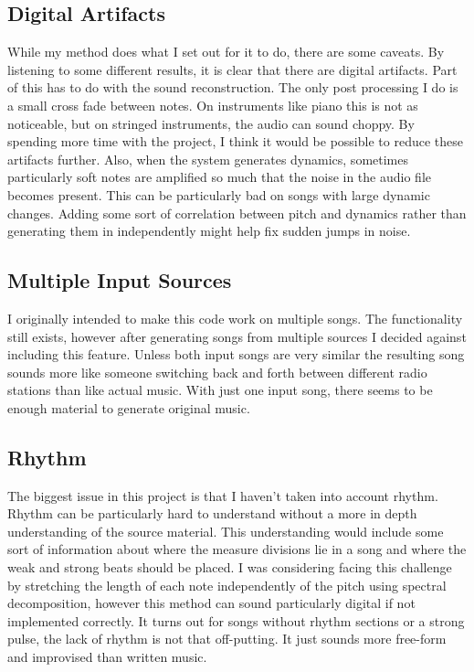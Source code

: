 \documentclass{amsart}
\theoremstyle{definition}
\begin{document}
\subsection{Digital Artifacts}

While my method does what I set out for it to do, there are some caveats. 
By listening to some different results, it is clear that there are digital artifacts.
Part of this has to do with the sound reconstruction.
The only post processing I do is a small cross fade between notes.
On instruments like piano this is not as noticeable, but on stringed instruments, the audio can sound choppy.
By spending more time with the project, I think it would be possible to reduce these artifacts further.
Also, when the system generates dynamics, sometimes particularly soft notes are amplified so much that the noise in the audio file becomes present.
This can be particularly bad on songs with large dynamic changes.
Adding some sort of correlation between pitch and dynamics rather than generating them in independently might help fix sudden jumps in noise.

\subsection{Multiple Input Sources}

I originally intended to make this code work on multiple songs.
The functionality still exists, however after generating songs from multiple sources
I decided against including this feature.
Unless both input songs are very similar the resulting song sounds more like someone switching back and forth between
different radio stations than like actual music.
With just one input song, there seems to be enough material to generate original music.

\subsection{Rhythm}

The biggest issue in this project is that I haven't taken into account rhythm.
Rhythm can be particularly hard to understand without a more in depth understanding of the source material.
This understanding would include some sort of information about where the measure divisions lie in a song and where the weak and strong beats should be placed.
I was considering facing this challenge by stretching the length of each note independently of the pitch using spectral decomposition, however this method can sound particularly digital if not implemented correctly.
It turns out for songs without rhythm sections or a strong pulse, the lack of rhythm is not that off-putting. It just sounds more free-form and improvised than written music.
\end{document}

